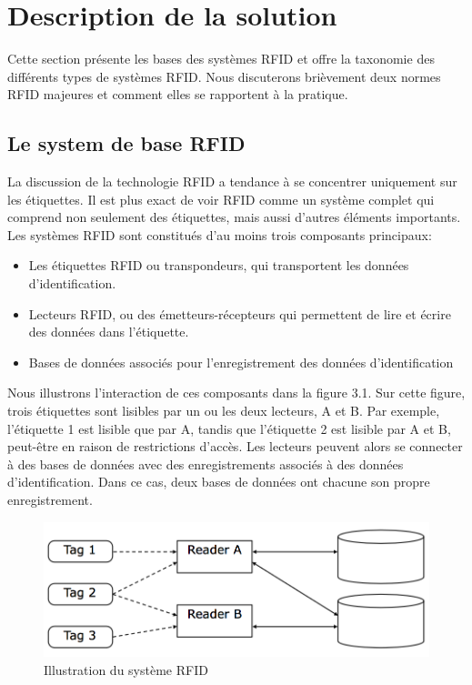 \documentclass[11pt, a4paper, twoside]{book}
\begin{document}
\section{Description de la solution}
Cette section présente les bases des systèmes RFID et offre la taxonomie des différents types de systèmes RFID. Nous discuterons brièvement deux normes RFID majeures et comment elles se rapportent à la pratique.
\subsection{Le system de base RFID}
La discussion de la technologie RFID a tendance à se concentrer uniquement sur les étiquettes. Il est plus exact de voir RFID comme un système complet qui comprend non seulement des étiquettes, mais aussi d'autres éléments importants. Les systèmes RFID sont constitués d'au moins trois composants principaux:
\begin{itemize}
\item Les étiquettes RFID ou transpondeurs, qui transportent les données d'identification.
\item Lecteurs RFID, ou des émetteurs-récepteurs qui permettent de lire et écrire des données dans l'étiquette.
\item Bases de données associés pour l'enregistrement des données d'identification\\
\end{itemize}

Nous illustrons l'interaction de ces composants dans la figure 3.1. Sur cette figure, trois étiquettes sont lisibles par un ou les deux lecteurs, A et B. Par exemple, l'étiquette 1 est lisible que par A, tandis que l'étiquette 2 est lisible par A et B, peut-être en raison de restrictions d'accès. Les lecteurs peuvent alors se connecter à des bases de données avec des enregistrements associés à des données d'identification. Dans ce cas, deux bases de données ont chacune son propre enregistrement.\\
\begin{figure}[H]
\centering
\includegraphics[width=\textwidth]{shema}
\caption{Illustration du système RFID}
\end{figure}
\end{document}
